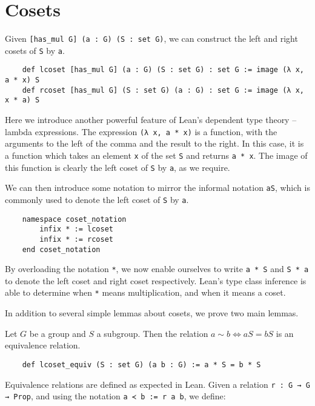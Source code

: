 \documentclass[runningheads,a4paper]{llncs}
\renewcommand{\-}{\setminus}
\begin{document}
\section{Cosets}

Given \lstinline{[has_mul G] (a : G) (S : set G)}, we can construct the left and right cosets of \lstinline{S} by \lstinline{a}.

\begin{lstlisting}
    def lcoset [has_mul G] (a : G) (S : set G) : set G := image (λ x, a * x) S
    def rcoset [has_mul G] (S : set G) (a : G) : set G := image (λ x, x * a) S
\end{lstlisting}

Here we introduce another powerful feature of Lean's dependent type theory -- lambda expressions. The expression \lstinline{(λ x, a * x)} is a function, with the arguments to the left of the comma and the result to the right. In this case, it is a function which takes an element \lstinline{x} of the set \lstinline{S} and returns \lstinline{a * x}. The image of this function is clearly the left coset of \lstinline{S} by \lstinline{a}, as we require.

We can then introduce some notation to mirror the informal notation \lstinline{aS}, which is commonly used to denote the left coset of \lstinline{S} by \lstinline{a}.

\begin{lstlisting}
    namespace coset_notation
        infix * := lcoset
        infix * := rcoset
    end coset_notation
\end{lstlisting}

By overloading the notation \lstinline{*}, we now enable ourselves to write \lstinline{a * S} and \lstinline{S * a} to denote the left coset and right coset respectively. Lean's type class inference is able to determine when \lstinline{*} means multiplication, and when it means a coset.

In addition to several simple lemmas about cosets, we prove two main lemmas.

\begin{lemma}
Let $G$ be a group and $S$ a subgroup. Then the relation $a \sim b \iff aS = bS$ is an equivalence relation.
\end{lemma}

\begin{lstlisting}
    def lcoset_equiv (S : set G) (a b : G) := a * S = b * S
\end{lstlisting}

Equivalence relations are defined as expected in Lean. Given a relation \lstinline{r : G → G → Prop}, and using the notation \lstinline{a ≺ b := r a b}, we define:
\end{document}
